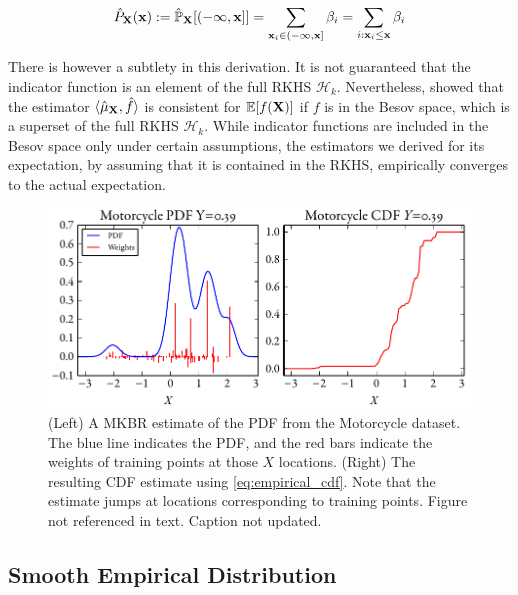 \documentclass[twoside]{article} \usepackage{aistats2017}
\theoremstyle{definition}
\newcommand{\rv}[1]{{#1}}
\newcommand{\warn}[1]{{\color{red} #1}}
\begin{document}
		\begin{equation}
			\hat{P}_{\bvec{\rv{X}}}(\bvec{x}) := \hat{\mathbb{P}}_{\bvec{\rv{X}}}[(-\bvec{\infty}, \bvec{x}]] = \sum_{\bvec{x}_{i} \in (-\bvec{\infty}, \bvec{x}]} \beta_{i} = \sum_{i : \bvec{x}_{i} \leq \bvec{x}} \beta_{i}
		\label{eq:empirical_cdf}
		\end{equation}

		There is however a subtlety in this derivation. It is not guaranteed that the indicator function is an element of the full RKHS $\mathcal{H}_{k}$. Nevertheless, \cite{Kanagawa:RecoveringDistributions} showed that the estimator $\langle \hat{\mu}_{\bvec{\rv{X}}}, \hat{f} \rangle$ is consistent for $\mathbb{E}[f(\bvec{\rv{X}})]$ if $f$ is in the Besov space, which is a superset of the full RKHS $\mathcal{H}_{k}$. While indicator functions are included in the Besov space only under certain assumptions, the estimators we derived for its expectation, by assuming that it is contained in the RKHS, empirically converges to the actual expectation.

		\begin{figure}
			\begin{center}
				\includegraphics[width=\columnwidth]{figures/cumulativeexampleragged}
			\end{center}
			\caption{\small (Left) A MKBR estimate of the PDF from the Motorcycle dataset. The blue line indicates the PDF, and the red bars indicate the weights of training points at those $X$ locations. (Right) The resulting CDF estimate using \eqref{eq:empirical_cdf}. Note that the estimate jumps at locations corresponding to training points. \warn{Figure not referenced in text. Caption not updated.}}
			\label{fig:cumulativeragged} 
		\end{figure}

	\subsection{Smooth Empirical Distribution}
	\label{sec:discriminative_quantile_regression:smooth_empirical_distribution}
\end{document}

